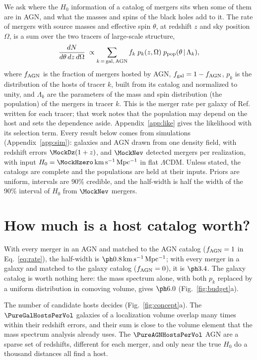 \documentclass[aps,prd,reprint,superscriptaddress,nofootinbib]{revtex4-2}
\newcommand{\kms}{\,{\rm km\,s^{-1}\,Mpc^{-1}}}
\newcommand{\fagn}{f_{\rm AGN}}
\begin{document}
We ask where the $H_0$ information of a catalog of mergers sits when some of them are in AGN,
and what the masses and spins of the black holes add to it. The rate of mergers with source
masses and effective spin $\theta$, at redshift $z$ and sky position $\Omega$, is a sum over the
two tracers of large-scale structure,
\begin{equation}
\frac{dN}{d\theta\,dz\,d\Omega}\;\propto\sum_{k\,=\,{\rm gal},\,{\rm AGN}}
f_k\;p_k(z,\Omega)\;p_{\rm pop}(\theta\,|\,\Lambda_k),
\label{eq:rate}
\end{equation}
where $\fagn$ is the fraction of mergers hosted by AGN, $f_{\rm gal}=1-\fagn$, $p_k$ is the
distribution of the hosts of tracer $k$, built from its catalog and normalized to unity, and
$\Lambda_k$ are the parameters of the mass and spin distribution (the population) of the mergers
in tracer $k$. This is the merger rate per galaxy of Ref.~\cite{Mastrogiovanni:2023emh} written
for each tracer; that work notes that the population may depend on the host and sets the
dependence aside. Appendix~\ref{app:like} gives the likelihood with its selection term. Every
result below comes from simulations (Appendix~\ref{app:sim}): galaxies and AGN drawn from one
density field, with redshift errors $\MockDz(1+z)$, and $\MockNev$ detected mergers per
realization, with input $H_0=\MockHzero\kms$ in flat $\Lambda$CDM. Unless stated, the catalogs
are complete and the
populations are held at their inputs. Priors are uniform, intervals are 90\% credible, and the
half-width is half the width of the 90\% interval of $H_0$ from $\MockNev$ mergers.

\section{How much is a host catalog worth?}
\label{sec:worth}

With every merger in an AGN and matched to the AGN catalog ($\fagn=1$ in Eq.~\eqref{eq:rate}),
the half-width is $\IndHWAGN\kms$; with every merger in a galaxy and matched to the galaxy
catalog ($\fagn=0$), it is $\IndHWGal$. %
The galaxy catalog is worth nothing here: the mass spectrum alone, with both $p_k$ replaced by a
uniform distribution in comoving volume, gives $\IndHWSpec$ (Fig.~\ref{fig:budget}a). %

The number of candidate hosts decides (Fig.~\ref{fig:concept}a). The $\PureGalHostsPerVol$
galaxies of a localization
volume overlap many times within their redshift errors, and their sum is close to the volume
element that the mass spectrum analysis already uses. The $\PureAGNHostsPerVol$ AGN are a sparse
set of redshifts, different for each merger, and only near the true $H_0$ do a thousand
distances all find a host.
\end{document}
